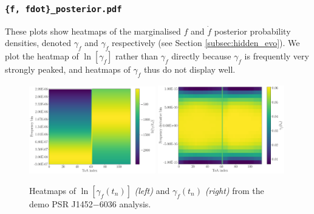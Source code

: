 \documentclass{article}
\begin{document}
\subsubsection{\texttt{\{f, fdot\}\_posterior.pdf}}
These plots show heatmaps of the marginalised $f$ and $\dot{f}$ posterior probability densities, denoted $\gamma_f$ and $\gamma_{\dot{f}}$ respectively (see Section \ref{subsec:hidden_evo}).
We plot the heatmap of $\ln[\gamma_f]$ rather than $\gamma_f$ directly because $\gamma_f$ is frequently very strongly peaked, and heatmaps of $\gamma_f$ thus do not display well.
\begin{figure}
    \centering
    \includegraphics[width=0.49\textwidth]{figures/J1452-6036_f_posterior.pdf}
    \includegraphics[width=0.49\textwidth]{figures/J1452-6036_fdot_posterior.pdf}
    \caption{Heatmaps of $\ln[\gamma_f(t_n)]$ \emph{(left)} and $\gamma_{\dot{f}}(t_n)$ \emph{(right)} from the demo PSR J1452$-$6036 analysis.}
    \label{fig:my_label}
\end{figure}
{}
\end{document}
